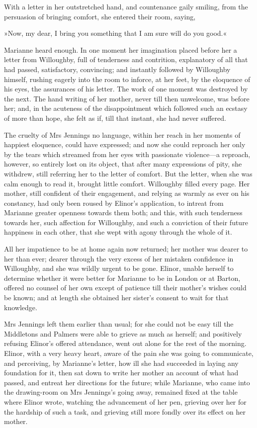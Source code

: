 With a letter in her outstretched hand, and countenance gaily smiling, from the persuasion of bringing comfort, she entered their room, saying,

»Now, my dear, I bring you something that I am sure will do you good.«

Marianne heard enough. In one moment her imagination placed before her a letter from Willoughby, full of tenderness and contrition, explanatory of all that had passed, satisfactory, convincing; and instantly followed by Willoughby himself, rushing eagerly into the room to inforce, at her feet, by the eloquence of his eyes, the assurances of his letter. The work of one moment was destroyed by the next. The hand writing of her mother, never till then unwelcome, was before her; and, in the acuteness of the disappointment which followed such an ecstasy of more than hope, she felt as if, till that instant, she had never suffered.

The cruelty of Mrs Jennings no language, within her reach in her moments of happiest eloquence, could have expressed; and now she could reproach her only by the tears which streamed from her eyes with passionate violence—a reproach, however, so entirely lost on its object, that after many expressions of pity, she withdrew, still referring her to the letter of comfort. But the letter, when she was calm enough to read it, brought little comfort. Willoughby filled every page. Her mother, still confident of their engagement, and relying as warmly as ever on his constancy, had only been roused by Elinor’s application, to intreat from Marianne greater openness towards them both; and this, with such tenderness towards her, such affection for Willoughby, and such a conviction of their future happiness in each other, that she wept with agony through the whole of it.

All her impatience to be at home again now returned; her mother was dearer to her than ever; dearer through the very excess of her mistaken confidence in Willoughby, and she was wildly urgent to be gone. Elinor, unable herself to determine whether it were better for Marianne to be in London or at Barton, offered no counsel of her own except of patience till their mother’s wishes could be known; and at length she obtained her sister’s consent to wait for that knowledge.

Mrs Jennings left them earlier than usual; for she could not be easy till the Middletons and Palmers were able to grieve as much as herself; and positively refusing Elinor’s offered attendance, went out alone for the rest of the morning. Elinor, with a very heavy heart, aware of the pain she was going to communicate, and perceiving, by Marianne’s letter, how ill she had succeeded in laying any foundation for it, then sat down to write her mother an account of what had passed, and entreat her directions for the future; while Marianne, who came into the drawing-room on Mrs Jennings’s going away, remained fixed at the table where Elinor wrote, watching the advancement of her pen, grieving over her for the hardship of such a task, and grieving still more fondly over its effect on her mother.

